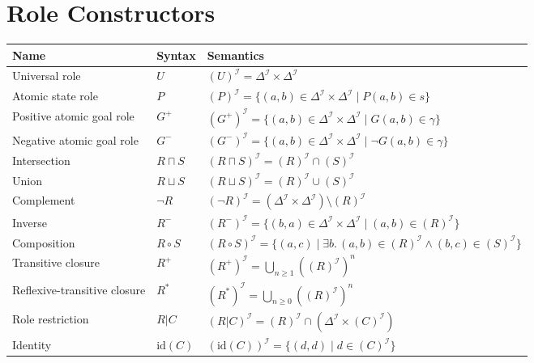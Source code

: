 \documentclass[11pt]{article}
\newcommand{\I}{\mathcal{I}}
\newcommand{\DeltaI}{\Delta^{\I}}
\newcommand{\sem}[1]{\left(#1\right)^{\I}}
\newenvironment{compacttable}
  {\begingroup\setlength{\tabcolsep}{3pt}}
  {\endgroup}
\begin{document}
\section{Role Constructors}

\begin{compacttable}
\begin{longtable}{>{\raggedright\arraybackslash}p{}
                  >{\centering\arraybackslash}p{}
                  >{\raggedright\arraybackslash}p{}}
\toprule
Name & Syntax & Semantics \\
\midrule
\endhead

Universal role &
$U$ &
$\sem{U} = \DeltaI \times \DeltaI$ \\

Atomic state role &
$P$ &
$\sem{P} = \{ (a,b) \in \DeltaI \times \DeltaI \mid P(a,b) \in s \}$ \\

Positive atomic goal role &
$G^+$ &
$\sem{{G^+}} = \{ (a,b) \in \DeltaI \times \DeltaI \mid G(a,b) \in \gamma \}$ \\

Negative atomic goal role &
$G^-$ &
$\sem{{G^-}} = \{ (a,b) \in \DeltaI \times \DeltaI \mid \neg G(a,b) \in \gamma \}$ \\

Intersection &
$R \sqcap S$ &
$\sem{R \sqcap S} = \sem{R} \cap \sem{S}$ \\

Union &
$R \sqcup S$ &
$\sem{R \sqcup S} = \sem{R} \cup \sem{S}$ \\

Complement &
$\neg R$ &
$\sem{\neg R} = (\DeltaI \times \DeltaI) \setminus \sem{R}$ \\

Inverse &
$R^{-}$ &
$\sem{R^{-}} = \{(b,a)\in\DeltaI\times\DeltaI \mid (a,b)\in\sem{R}\}$ \\

Composition &
$R \circ S$ &
$\sem{R \circ S} = \{(a,c) \mid \exists b.\,(a,b)\in\sem{R} \land (b,c)\in\sem{S}\}$ \\

Transitive closure &
$R^{+}$ &
$\sem{R^{+}} = \bigcup_{n\geq 1}(\sem{R})^n$ \\

Reflexive-transitive closure &
$R^{*}$ &
$\sem{R^{*}} = \bigcup_{n\geq 0}(\sem{R})^n$ \\

Role restriction &
$R|C$ &
$\sem{R|C} = \sem{R} \cap (\DeltaI \times \sem{C})$ \\

Identity &
$\mathrm{id}(C)$ &
$\sem{\mathrm{id}(C)} = \{(d,d) \mid d\in\sem{C}\}$ \\

\bottomrule
\end{longtable}
\end{compacttable}
\end{document}
